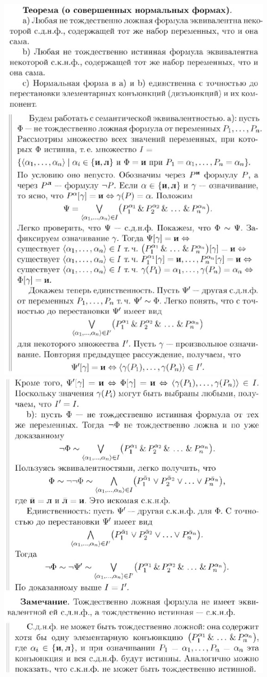 \documentclass[a4paper]{article}
\theoremstyle{definition}
\begin{document}
\begin{enumerate}
       \includegraphics[scale=0.9]{39_2.jpg}\\
       \includegraphics[scale=0.75]{39_3.jpg}

\end{enumerate}
\end{document}
